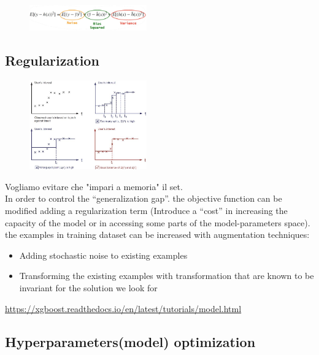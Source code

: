 \begin{figure}[ht]
	\centering
	\includegraphics[width=0.45\textwidth]{figure_ml/generalization3.png}
\end{figure}
\FloatBarrier


\subsection{Regularization}

\begin{figure}
	\includegraphics[width=0.45\textwidth]{figure_ml/regularization.png}
\end{figure} 

Vogliamo evitare che "impari a memoria" il set.\\
In order to control the “generalization gap”. the objective function can be modified adding a regularization term (Introduce a “cost” in increasing the capacity of the model or in accessing some parts of the model-parameters space).\\

the examples in training dataset can be increased with augmentation techniques:

\begin{itemize}
	\item Adding stochastic noise to existing examples
	\item Transforming the existing examples with transformation that are known to be invariant 	for the solution we look for
\end{itemize}


\url{https://xgboost.readthedocs.io/en/latest/tutorials/model.html}



\subsection{Hyperparameters(model) optimization}


